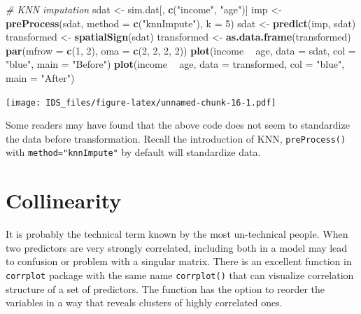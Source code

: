 \documentclass[12pt,]{krantz}
\makeatletter
\newenvironment{Shaded}{\begin{snugshade}}{\end{snugshade}}
\newcommand{\CommentTok}[1]{\textcolor[rgb]{0.37,0.37,0.37}{\textit{#1}}}
\newcommand{\DataTypeTok}[1]{\textcolor[rgb]{0.27,0.27,0.27}{#1}}
\newcommand{\DecValTok}[1]{\textcolor[rgb]{0.06,0.06,0.06}{#1}}
\newcommand{\KeywordTok}[1]{\textcolor[rgb]{0.27,0.27,0.27}{\textbf{#1}}}
\newcommand{\NormalTok}[1]{#1}
\newcommand{\OperatorTok}[1]{\textcolor[rgb]{0.43,0.43,0.43}{\textbf{#1}}}
\newcommand{\StringTok}[1]{\textcolor[rgb]{0.5,0.5,0.5}{#1}}
\newenvironment{kframe}{%
\medskip{}
\setlength{\fboxsep}{.8em}
 \def\at@end@of@kframe{}%
 \ifinner\ifhmode%
  \def\at@end@of@kframe{\end{minipage}}%
  \begin{minipage}{\columnwidth}%
 \fi\fi%
 \def\FrameCommand##1{\hskip\@totalleftmargin \hskip-\fboxsep
 \colorbox{shadecolor}{##1}\hskip-\fboxsep
     \hskip-\linewidth \hskip-\@totalleftmargin \hskip\columnwidth}%
 \MakeFramed {\advance\hsize-\width
   \@totalleftmargin\z@ \linewidth\hsize
   \@setminipage}}%
 {\par\unskip\endMakeFramed%
 \at@end@of@kframe}
\renewenvironment{Shaded}{\begin{kframe}}{\end{kframe}}
\makeatother
\begin{document}
\begin{Shaded}
\begin{Highlighting}[]
\CommentTok{# KNN imputation}
\NormalTok{sdat <-}\StringTok{ }\NormalTok{sim.dat[, }\KeywordTok{c}\NormalTok{(}\StringTok{"income"}\NormalTok{, }\StringTok{"age"}\NormalTok{)]}
\NormalTok{imp <-}\StringTok{ }\KeywordTok{preProcess}\NormalTok{(sdat, }\DataTypeTok{method =} \KeywordTok{c}\NormalTok{(}\StringTok{"knnImpute"}\NormalTok{), }\DataTypeTok{k =} \DecValTok{5}\NormalTok{)}
\NormalTok{sdat <-}\StringTok{ }\KeywordTok{predict}\NormalTok{(imp, sdat)}
\NormalTok{transformed <-}\StringTok{ }\KeywordTok{spatialSign}\NormalTok{(sdat)}
\NormalTok{transformed <-}\StringTok{ }\KeywordTok{as.data.frame}\NormalTok{(transformed)}
\KeywordTok{par}\NormalTok{(}\DataTypeTok{mfrow =} \KeywordTok{c}\NormalTok{(}\DecValTok{1}\NormalTok{, }\DecValTok{2}\NormalTok{), }\DataTypeTok{oma =} \KeywordTok{c}\NormalTok{(}\DecValTok{2}\NormalTok{, }\DecValTok{2}\NormalTok{, }\DecValTok{2}\NormalTok{, }\DecValTok{2}\NormalTok{))}
\KeywordTok{plot}\NormalTok{(income }\OperatorTok{~}\StringTok{ }\NormalTok{age, }\DataTypeTok{data =}\NormalTok{ sdat, }\DataTypeTok{col =} \StringTok{"blue"}\NormalTok{, }\DataTypeTok{main =} \StringTok{"Before"}\NormalTok{)}
\KeywordTok{plot}\NormalTok{(income }\OperatorTok{~}\StringTok{ }\NormalTok{age, }\DataTypeTok{data =}\NormalTok{ transformed, }\DataTypeTok{col =} \StringTok{"blue"}\NormalTok{, }\DataTypeTok{main =} \StringTok{"After"}\NormalTok{)}
\end{Highlighting}
\end{Shaded}

\texttt{[image: IDS\_files/figure-latex/unnamed-chunk-16-1.pdf]}

Some readers may have found that the above code does not seem to standardize the data before transformation. Recall the introduction of KNN, \texttt{preProcess()} with \texttt{method="knnImpute"} by default will standardize data.

\hypertarget{collinearity}{%
\section{Collinearity}\label{collinearity}}

It is probably the technical term known by the most un-technical people. When two predictors are very strongly correlated, including both in a model may lead to confusion or problem with a singular matrix. There is an excellent function in \texttt{corrplot} package with the same name \texttt{corrplot()} that can visualize correlation structure of a set of predictors. The function has the option to reorder the variables in a way that reveals clusters of highly correlated ones.
\end{document}

